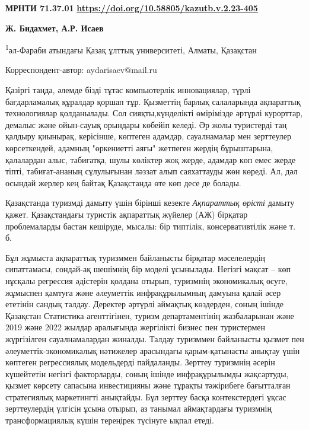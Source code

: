 \newpage
{\bfseries МРНТИ 71.37.01}
\hfill {\bfseries \href{https://doi.org/10.58805/kazutb.v.2.23-405}{https://doi.org/10.58805/kazutb.v.2.23-405}}


\begin{center}
{\bfseries Ж. Бидахмет, А.Р. Исаев\envelope}

\textsuperscript{1}әл-Фараби атындағы Қазақ ұлттық университеті, Алматы,
Қазақстан

\envelope Корреспондент-автор: aydarisaev@mail.ru
\end{center}

Қазіргі таңда, әлемде бізді тұтас компьютерлік инновациялар, түрлі
бағдарламалық құралдар қоршап тұр. Қызметтің барлық салаларында
ақпараттық технологиялар қолданылады. Сол сияқты,күнделікті өмірімізде
әртүрлі курорттар, демалыс және ойын-сауық орындары көбейіп келеді. Әр
жолы туристерді таң қалдыру қиынырақ, керісінше, көптеген адамдар,
сауалнамалар мен зерттеулер көрсеткендей, адамның "өркениетті аяғы"
жетпеген жердің бұрыштарына, қалалардан алыс, табиғатқа, шулы көліктер
жоқ жерде, адамдар көп емес жерде тіпті, табиғат-ананың сұлулығынан
ләззат алып саяхаттауды жөн көреді. Ал, дәл осындай жерлер кең байтақ
Қазақстанда өте көп десе де болады.

Қазақстанда туризмді дамыту үшін бірінші кезекте \emph{Ақпараттық
өрісті} дамыту қажет. Қазақстандағы туристік ақпараттық жүйелер (АЖ)
бірқатар проблемаларды бастан кешіруде, мысалы: бір типтілік,
консервативтілік және т. б.

Бұл жұмыста ақпараттық туризммен байланысты бірқатар мәселелердің
сипаттамасы, сондай-ақ шешімнің бір моделі ұсынылады. Негізгі мақсат --
көп нұсқалы регрессия әдістерін қолдана отырып, туризмнің экономикалық
өсуге, жұмыспен қамтуға және әлеуметтік инфрақұрылымның дамуына қалай
әсер ететінін сандық талдау. Деректер әртүрлі аймақтық көздерден, соның
ішінде Қазақстан Статистика агенттігінен, туризм департаментінің
жазбаларынан және 2019 және 2022 жылдар аралығында жергілікті бизнес пен
туристермен жүргізілген сауалнамалардан жиналды. Талдау туризммен
байланысты қызмет пен әлеуметтік-экономикалық нәтижелер арасындағы
қарым-қатынасты анықтау үшін көптеген регрессиялық модельдерді
пайдаланды. Зерттеу туризмнің әсерін күшейтетін негізгі факторларды,
соның ішінде инфрақұрылымды жақсартуды, қызмет көрсету сапасына
инвестицияны және тұрақты тәжірибеге бағытталған стратегиялық
маркетингті анықтайды. Бұл зерттеу басқа контекстердегі ұқсас
зерттеулердің үлгісін ұсына отырып, аз танымал аймақтардағы туризмнің
трансформациялық күшін тереңірек түсінуге ықпал етеді.

